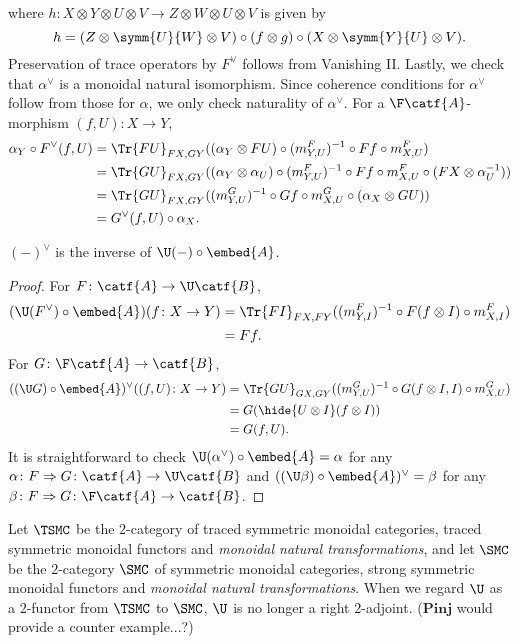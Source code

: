 where \(h \colon X \otimes Y \otimes U \otimes V \to Z \otimes W \otimes U \otimes V\)
is given by
\begin{equation*}
  h = (Z \otimes \symm{U}{W} \otimes V) \circ (f \otimes g) \circ
  (X \otimes \symm{Y}{U} \otimes V).
\end{equation*}
Preservation of trace operators by \(F^{\vee}\) follows from
Vanishing II. Lastly, we check that \(\alpha^{\vee}\) is a monoidal
natural isomorphism. Since coherence conditions for \(\alpha^{\vee}\)
follow from those for \(\alpha\), we only check naturality of \(\alpha^{\vee}\).
For a \(\F\catf{A}\)-morphism \((f,U) \colon X \to Y\),
\begin{align*}
  \alpha_{Y} \circ F^{\vee}(f,U)
  &= \Tr{FU}_{FX,GY}((\alpha_{Y} \otimes FU) \circ (m^{F}_{Y,U})^{-1} \circ Ff \circ m^{F}_{X,U}) \\
  &= \Tr{GU}_{FX,GY}((\alpha_{Y} \otimes \alpha_{U}) \circ (m^{F}_{Y,U})^{-1} \circ Ff \circ m^{F}_{X,U}
  \circ (FX \otimes \alpha^{-1}_{U})) \\
  &= \Tr{GU}_{FX,GY}((m^{G}_{Y,U})^{-1} \circ Gf \circ m^{G}_{X,U}
  \circ (\alpha_{X} \otimes GU)) \\
  &= G^{\vee} (f,U) \circ \alpha_{X}.
\end{align*}

\begin{proposition}
  \((-)^{\vee}\) is the inverse of \(\U(-) \circ \embed{A}\).
\end{proposition}
\begin{proof}
  For \(F \colon \catf{A} \to \U\catf{B}\),
  \begin{align*}
    (\U (F^{\vee}) \circ \embed{A})(f \colon X \to Y)
    &= \Tr{FI}_{FX,FY} ((m^{F}_{Y,I})^{-1} \circ F(f \otimes I) \circ m^{F}_{X,I}) \\
    &= Ff.
  \end{align*}
  For \(G \colon \F\catf{A} \to \catf{B}\),
  \begin{align*}
    ((\U G) \circ \embed{A})^{\vee}((f,U) \colon X \to Y)
    &= \Tr{GU}_{GX,GY}((m^{G}_{Y,U})^{-1} \circ G(f \otimes I,I) \circ m^{G}_{X,U}) \\
    &= G(\hide{U \otimes I}(f \otimes I)) \\
    &= G(f,U).
  \end{align*}
  It is straightforward to check
  \(\U (\alpha^{\vee}) \circ \embed{A} = \alpha\)
  for any \(\alpha \colon F \Rightarrow G \colon \catf{A} \to \U\catf{B}\)
  and \(((\U \beta) \circ \embed{A})^{\vee} = \beta\) 
  for any \(\beta \colon F \Rightarrow G \colon \F\catf{A} \to \catf{B}\).
\end{proof}

\begin{remark}
  Let \(\TSMC\) be the \(2\)-category of traced symmetric monoidal
  categories, traced symmetric monoidal functors and \emph{monoidal
    natural transformations}, and let \(\SMC\) be the \(2\)-category
  \(\SMC\) of symmetric monoidal categories, strong symmetric monoidal
  functors and \emph{monoidal natural transformations}.
  When we regard \(\U\) as a \(2\)-functor from \(\TSMC\) to \(\SMC\),
  \(\U\) is no longer a right \(2\)-adjoint. (\(\mathbf{Pinj}\) would
  provide a counter example...?)
\end{remark}
